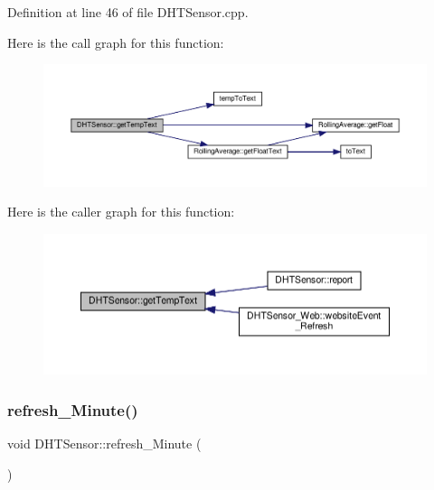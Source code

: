 Definition at line 46 of file D\+H\+T\+Sensor.\+cpp.

Here is the call graph for this function\+:
\nopagebreak
\begin{figure}[H]
\begin{center}
\leavevmode
\includegraphics[width=350pt]{class_d_h_t_sensor_ae2091b0774bf7504477c469efd053631_cgraph}
\end{center}
\end{figure}
Here is the caller graph for this function\+:
\nopagebreak
\begin{figure}[H]
\begin{center}
\leavevmode
\includegraphics[width=350pt]{class_d_h_t_sensor_ae2091b0774bf7504477c469efd053631_icgraph}
\end{center}
\end{figure}
\mbox{\label{class_d_h_t_sensor_a7e939e9b6e2e2910a67b98d820e9e552}} 
\subsubsection{\texorpdfstring{refresh\+\_\+\+Minute()}{refresh\_Minute()}\hspace{0.1cm}{\footnotesize\ttfamily [1/2]}}
{\footnotesize\ttfamily void D\+H\+T\+Sensor\+::refresh\+\_\+\+Minute (\begin{DoxyParamCaption}{ }\end{DoxyParamCaption})\hspace{0.3cm}{\ttfamily [virtual]}}



